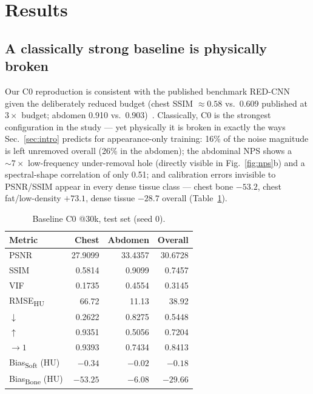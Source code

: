 \section{Results}
\label{sec:results}

\subsection{A classically strong baseline is physically broken}
\label{sec:audit}

Our C0 reproduction is consistent with the published benchmark RED-CNN given the deliberately reduced budget (chest SSIM ${\approx} 0.58$ vs.\ 0.609 published at $3\times$ budget; abdomen 0.910 vs.\ 0.903)~\cite{eulig2024}. Classically, C0 is the strongest configuration in the study --- yet physically it is broken in exactly the ways Sec.~\ref{sec:intro} predicts for appearance-only training: 16\% of the noise magnitude is left unremoved overall (26\% in the abdomen); the abdominal NPS shows a ${\sim}7\times$ low-frequency under-removal hole (directly visible in Fig.~\ref{fig:nps}b) and a spectral-shape correlation of only 0.51; and calibration errors invisible to PSNR/SSIM appear in every dense tissue class --- chest bone $-53.2$\hu{}, chest fat/low-density $+73.1$\hu{}, dense tissue $-28.7$\hu{} overall (Table~\ref{tab:baseline}).

\begin{table}[!tbp]
\centering
\caption{Baseline C0 @30k, test set (seed 0).}
\label{tab:baseline}
\small
\begin{tabular}{lrrr}
\toprule
Metric & Chest & Abdomen & Overall \\
\midrule
PSNR & 27.9099 & 33.4357 & 30.6728 \\
SSIM & 0.5814 & 0.9099 & 0.7457 \\
VIF & 0.1735 & 0.4554 & 0.3145 \\
RMSE\textsubscript{HU} & 66.72 & 11.13 & 38.92 \\
\npsl{} $\downarrow$ & 0.2622 & 0.8275 & 0.5448 \\
\npsc{} $\uparrow$ & 0.9351 & 0.5056 & 0.7204 \\
\stdr{} $\rightarrow 1$ & 0.9393 & 0.7434 & 0.8413 \\
Bias\textsubscript{Soft} (HU) & $-0.34$ & $-0.02$ & $-0.18$ \\
Bias\textsubscript{Bone} (HU) & $-53.25$ & $-6.08$ & $-29.66$ \\
\bottomrule
\end{tabular}
\end{table}

